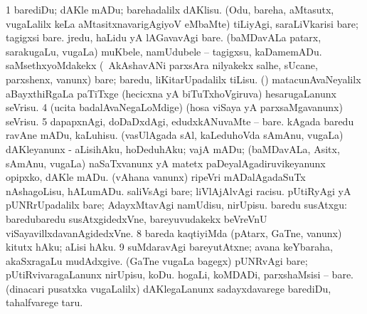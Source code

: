 {{{{{{\begin{center}
{{\noindent
\gl{\pagu}
\expl{}
\bmng
\bnum
\num{1} 
  
\banum
{} barediDu; dAKle mADu; barehadalilx dAKlisu. 
 (Odu, bareha, aMtasutx, \mo vugaLalilx keLa aMtasitxnavarigAgiyoV eMbaMte) tiLiyAgi, saraLiVkarisi bare; tagigxsi bare. 
 jredu, haLidu yA lAGavavAgi bare. 
 (baMDavALa patarx, sarakugaLu, \mo vugaLa) muKbele, namUdubele -- tagigxsu, kaDamemADu. 
\eanum
\numie
{}  
\banum
{} saMsethxyoMdakekx (\kanmu\ AkAshavANi parxsAra nilyakekx salhe, sUcane, parxshenx, \mo vanunx) bare; baredu, liKitarUpadalilx tiLisu. 
 (\ame) matacunAvaNeyalilx aBayxthiRgaLa paTiTxge (hecicxna yA biTuTxhoVgiruva) hesarugaLanunx seVrisu. 
\eanum
\numie
\num{4} (ucita badalAvaNegaLoMdige) (hosa viSaya yA parxsaMgavanunx) seVrisu. 
\num{5}  dapapxnAgi, doDaDxdAgi, edudxkANuvaMte -- bare. 
\banum
{} kAgada baredu ravAne mADu, kaLuhisu. 
 (vasUlAgada sAl, kaLeduhoVda sAmAnu, \mo vugaLa) dAKleyanunx - aLisihAku, hoDeduhAku; vajA mADu; (baMDavALa, Asitx, sAmAnu, \mo vugaLa) naSaTxvanunx yA matetx paDeyalAgadiruvikeyanunx opipxko, dAKle mADu. 
 (vAhana \mo vanunx) ripeVri mADalAgadaSuTx nAshagoLisu, hALumADu. 
 saliVsAgi bare; liVlAjAlvAgi racisu. 
\eanum
\numie
{}  
\banum
{} pUtiRyAgi yA pUNRrUpadalilx bare; AdayxMtavAgi namUdisu, nirUpisu. 
 baredu susAtxgu:  baredubaredu susAtxgidedxVne, bareyuvudakekx beVreVnU viSayavillxdavanAgidedxVne. 
\eanum
\numie
\num{8} bareda kaqtiyiMda (pAtarx, GaTne, \mo vanunx) kitutx hAku; aLisi hAku. 
\num{9}  suMdaravAgi bareyutAtxne; avana keYbaraha, akaSxragaLu mudAdxgive. 
  
\banum
{} (GaTne \mo vugaLa bagegx) pUNRvAgi bare; pUtiRvivaragaLanunx nirUpisu, koDu. 
 hogaLi, koMDADi, parxshaMsisi -- bare. 
 (dinacari pusatxka \mo vugaLalilx) dAKlegaLanunx sadayxdavarege barediDu, tahalfvarege taru. 
\eanum
\numie
\enum
\emng
\eentry

\bentry
{} 
\gl{\nA}
\enum
\emng

}}
\end{center}}}}}}}
